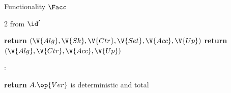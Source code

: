 \begin{interface}[nofloat]{Functionality $\Facc$ \\
}
{\begin{multicols}{2}
 \quad from $\id'$
\begin{algorithmic}[1]
\algcont
{}
\State \textbf{return} $(\V{Alg}, \V{Sk}, \V{Ctr}, \V{Set}, \V{Acc}, \V{Up})$ \label{ln:accleakam}
\EndIf
\State \textbf{return} $(\V{Alg}, \V{Ctr}, \V{Acc}, \V{Up})$ \label{ln:accleak}
\algsave
\end{algorithmic}
\vspace{1.4ex}

:
\begin{algorithmic}[1]
\algcont
\State \textbf{return} $A.\op{Ver}$ is deterministic and total \label{ln:accclean}
\algsave
\end{algorithmic}
\end{multicols}}
\end{interface}
